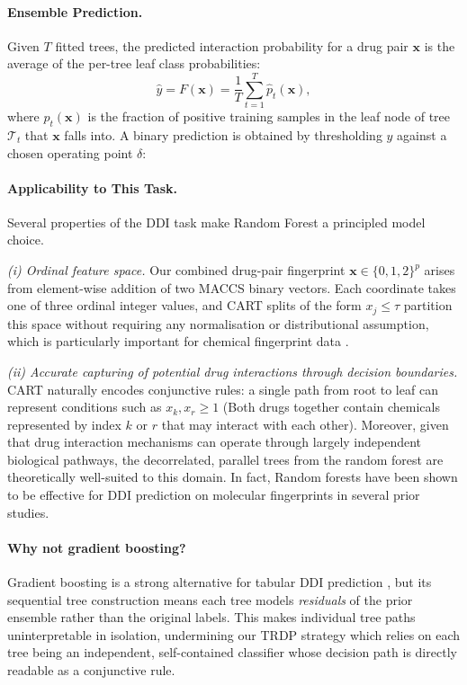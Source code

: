 \documentclass[letterpaper]{article} %
\begin{document}
\paragraph{Ensemble Prediction.}
Given $T$ fitted trees, the predicted interaction probability for a drug pair $\mathbf{x}$ is the average of the per-tree leaf class probabilities:
\begin{equation}
    \hat{y} = F(\mathbf{x}) = \frac{1}{T} \sum_{t=1}^{T} \hat{p}_t(\mathbf{x}),
    \label{eq:rf_pred}
\end{equation}
where $\hat{p}_t(\mathbf{x})$ is the fraction of positive training samples in the leaf node of tree $\mathcal{T}_t$ that $\mathbf{x}$ falls into. A binary prediction is obtained by thresholding $\hat{y}$ against a chosen operating point $\delta$:

\paragraph{Applicability to This Task.}
Several properties of the DDI task make Random Forest a principled model choice.
 
\textit{(i) Ordinal feature space.} Our combined drug-pair fingerprint $\mathbf{x} \in \{0, 1, 2\}^{p}$ arises from element-wise addition of two MACCS binary vectors. Each coordinate takes one of three ordinal integer values, and CART splits of the form $x_j \leq \tau$ partition this space without requiring any normalisation or distributional assumption, which is particularly important for chemical fingerprint data \cite{Svetnik2003}.
 
\textit{(ii) Accurate capturing of potential drug interactions through decision boundaries.} CART naturally encodes conjunctive rules: a single path from root to leaf can represent conditions such as  $x_k, x_r \geq 1$ (Both drugs together contain chemicals represented by index $k$ or $r$ that may interact with each other). Moreover, given that drug interaction mechanisms can operate through largely independent biological pathways, the decorrelated, parallel trees from the random forest are theoretically well-suited to this domain. In fact, Random forests have been shown to be effective for DDI prediction on molecular fingerprints in several prior studies\cite{Gottlieb2012,Vilar2012,Ryu2018}.
 
\paragraph{Why not gradient boosting?}
Gradient boosting is a strong alternative for tabular DDI prediction \cite{Ryu2018}, but its sequential tree construction means each tree models \emph{residuals} of the prior ensemble rather than the original labels. This makes individual tree paths uninterpretable in isolation, undermining our TRDP strategy which relies on each tree being an independent, self-contained classifier whose decision path is directly readable as a conjunctive rule.
\end{document}
